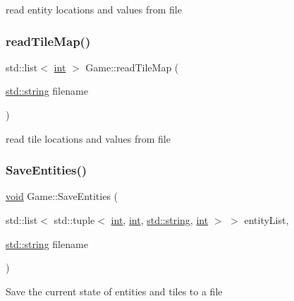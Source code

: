 read entity locations and values from file \mbox{\label{class_game_a611ea1285ac55df5229fed214efa333b}} 
\subsubsection{\texorpdfstring{readTileMap()}{readTileMap()}}
{\footnotesize\ttfamily std\+::list$<$ \mbox{\hyperlink{warnings_8h_a74f207b5aa4ba51c3a2ad59b219a423b}{int}} $>$ Game\+::read\+Tile\+Map (\begin{DoxyParamCaption}\item[{\mbox{\hyperlink{_s_d_l__opengl__glext_8h_ab4ccfaa8ab0e1afaae94dc96ef52dde1}{std\+::string}}}]{filename }\end{DoxyParamCaption})}

read tile locations and values from file \mbox{\label{class_game_ae6f0d940c21cbdc2951d6435f311c6d9}} 
\subsubsection{\texorpdfstring{SaveEntities()}{SaveEntities()}}
{\footnotesize\ttfamily \mbox{\hyperlink{_s_d_l__opengles2__gl2ext_8h_ae5d8fa23ad07c48bb609509eae494c95}{void}} Game\+::\+Save\+Entities (\begin{DoxyParamCaption}\item[{std\+::list$<$ std\+::tuple$<$ \mbox{\hyperlink{warnings_8h_a74f207b5aa4ba51c3a2ad59b219a423b}{int}}, \mbox{\hyperlink{warnings_8h_a74f207b5aa4ba51c3a2ad59b219a423b}{int}}, \mbox{\hyperlink{_s_d_l__opengl__glext_8h_ab4ccfaa8ab0e1afaae94dc96ef52dde1}{std\+::string}}, \mbox{\hyperlink{warnings_8h_a74f207b5aa4ba51c3a2ad59b219a423b}{int}} $>$ $>$}]{entity\+List,  }\item[{\mbox{\hyperlink{_s_d_l__opengl__glext_8h_ab4ccfaa8ab0e1afaae94dc96ef52dde1}{std\+::string}}}]{filename }\end{DoxyParamCaption})}

Save the current state of entities and tiles to a file \mbox{\label{class_game_a083193df013a787ccc3d819856822254}} 

